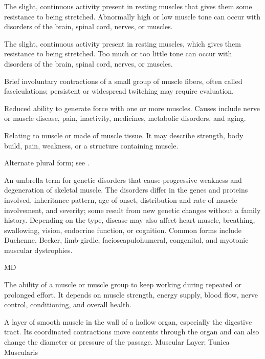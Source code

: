  The slight, continuous activity present in resting muscles that gives them some resistance to being stretched. Abnormally high or low muscle tone can occur with disorders of the brain, spinal cord, nerves, or muscles.

 The slight, continuous activity present in resting muscles, which gives them resistance to being stretched. Too much or too little tone can occur with disorders of the brain, spinal cord, nerves, or muscles.

 Brief involuntary contractions of a small group of muscle fibers, often called fasciculations; persistent or widespread twitching may require evaluation.

 Reduced ability to generate force with one or more muscles. Causes include nerve or muscle disease, pain, inactivity,
medicines, metabolic disorders, and aging.

 Relating to muscle or made of muscle tissue. It may describe strength, body build, pain, weakness, or a structure containing muscle.

 Alternate plural form; see .

 An umbrella term for genetic disorders that cause progressive weakness and degeneration of skeletal muscle.
The disorders differ in the genes and proteins involved, inheritance pattern, age of onset, distribution and rate of muscle
involvement, and severity; some result from new genetic changes without a family history. Depending on the type, disease
may also affect heart muscle, breathing, swallowing, vision, endocrine function, or cognition. Common forms include Duchenne,
Becker, limb-girdle, facioscapulohumeral, congenital, and myotonic muscular dystrophies.

\synonyms
MD

 The ability of a muscle or muscle group to keep working during repeated or prolonged effort. It depends on muscle strength, energy supply, blood flow, nerve control, conditioning, and overall health.

 A layer of smooth muscle in the wall of a hollow organ, especially the digestive tract. Its coordinated contractions move contents through the organ and can also change the diameter or pressure of the passage.
\synonyms
Muscular Layer; Tunica Muscularis

